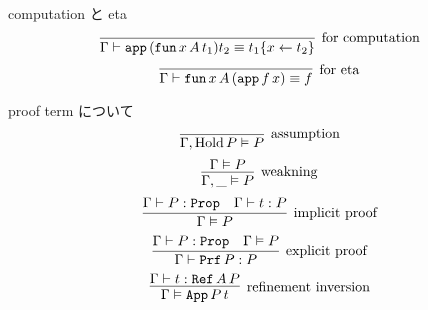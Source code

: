 \begin{itembox}[l]{computation と eta}
  \[\infer[\text{for computation}]{\Gamma \vdash \texttt{app} \, (\texttt{fun} \, x \, A \, t_1) t_2 \equiv t_1\{x \leftarrow t_2\} }{}\]
  \[\infer[\text{for eta}]{\Gamma \vdash \texttt{fun} \, x \, A \, (\texttt{app} \, f \, x) \equiv f}{}\]
\end{itembox}

\begin{itembox}[l]{proof term について}
  \[\infer[\text{assumption}]{\Gamma , \text{Hold} \, P \vDash P}{}\]
  \[\infer[\text{weakning}]{\Gamma , \_ \vDash P}{\Gamma \vDash P}\]
  \[\infer[\text{implicit proof}]{\Gamma \vDash P}{\Gamma \vdash P : \texttt{Prop} & \Gamma \vdash t : P} \]
  \[\infer[\text{explicit proof}]{\Gamma \vdash \texttt{Prf} \, P : P}{\Gamma \vdash P : \texttt{Prop} &\Gamma \vDash P} \]
  \[\infer[\text{refinement inversion}]{\Gamma \vDash \texttt{App} \, P \, t}{\Gamma \vdash t : \texttt{Ref} \, A \, P}\]
\end{itembox}